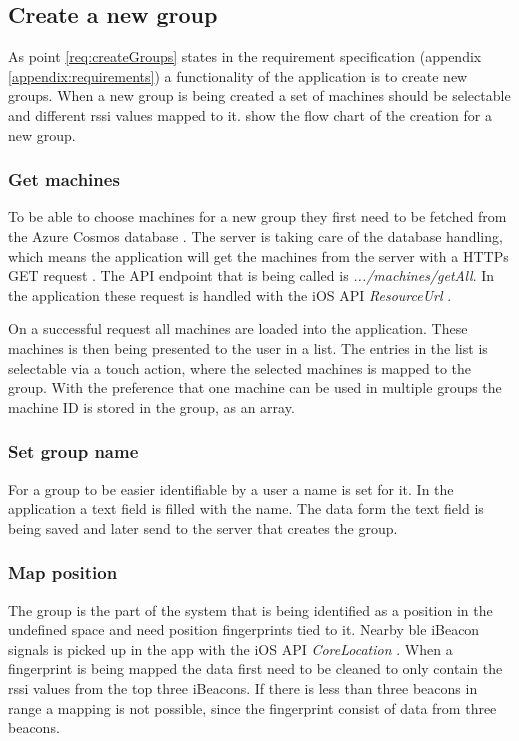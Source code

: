 \subsection{Create a new group}\label{sec:implAppNewGroup}
As point \ref{req:createGroups} states in the requirement specification (appendix \ref{appendix:requirements}) a functionality of the application is to create new groups.
When a new group is being created a set of machines should be selectable and different \acrshort{rssi} values mapped to it.
 show the flow chart of the creation for a new group.



\subsubsection{Get machines}\label{sec:implAppNewGroupGetMachines}
To be able to choose machines for a new group they first need to be fetched from the Azure Cosmos database \cite{IntroductionAzureCosmos}. 
The server is taking care of the database handling, which means the application will get the machines from the server with a HTTPs GET request \cite{GETHTTPMDN}.
The API endpoint that is being called is \textit{.../machines/getAll}.
In the application these request is handled with the iOS API \textit{ResourceUrl} \cite{ResourceURLAppleDeveloper}.

\bigskip

On a successful request all machines are loaded into the application.
These machines is then being presented to the user in a list.
The entries in the list is selectable via a touch action, where the selected machines is mapped to the group.
With the preference that one machine can be used in multiple groups the machine ID is stored in the group, as an array.


\subsubsection{Set group name}\label{sec:implAppNewGroupSetName}
For a group to be easier identifiable by a user a name is set for it.
In the application a text field is filled with the name.
The data form the text field is being saved and later send to the server that creates the group.


\subsubsection{Map position}\label{sec:implAppNewGroupMapPos}
The group is the part of the system that is being identified as a position in the undefined space and need position fingerprints tied to it.
Nearby \acrshort{ble} iBeacon signals is picked up in the app with the iOS API \textit{CoreLocation} \cite{CoreLocationApple}.
When a fingerprint is being mapped the data first need to be cleaned to only contain the \acrshort{rssi} values from the top three iBeacons.
If there is less than three beacons in range a mapping is not possible, since the fingerprint consist of data from three beacons.

